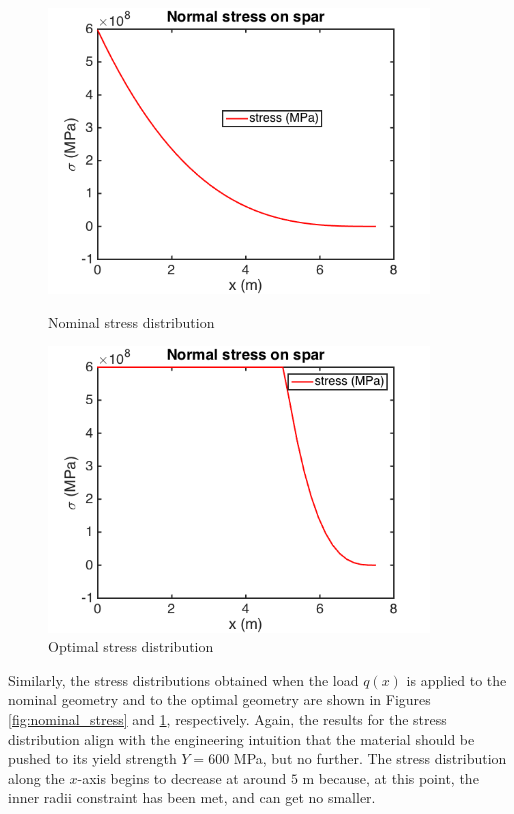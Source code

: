 \documentclass[11pt]{article}
\begin{document}
\begin{figure}[hbt]
\centering
\begin{minipage}[b]{0.4\textwidth}
\includegraphics[width=0.9\textwidth]{nominal_stress}
\caption{Nominal stress distribution}
\label{fig:nominal_stress}
\end{minipage}
\begin{minipage}[b]{0.4\textwidth}
\includegraphics[width=0.9\textwidth]{optimal_stress}
\caption{Optimal stress distribution}
\label{fig:optimal_stress}
\end{minipage}
\end{figure}

Similarly, the stress distributions obtained when the
load $q(x)$ is applied to the nominal geometry and to
the optimal geometry are shown in Figures
\ref{fig:nominal_stress} and \ref{fig:optimal_stress},
respectively. Again, the results for the stress
distribution align with the engineering intuition
that the material should be pushed to its yield
strength $Y = 600$ MPa, but no further. The stress
distribution along the $x$-axis begins to decrease
at around $5$ m because, at this point, the
inner radii constraint has been met, and can get
no smaller.
\end{document}
